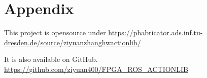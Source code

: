 \chapter{Appendix}

This project is opensource under \url{https://phabricator.ads.inf.tu-dresden.de/source/ziyuanzhanghwactionlib/}

It is also available on GitHub.
\url{https://github.com/ziyuan400/FPGA_ROS_ACTIONLIB}



